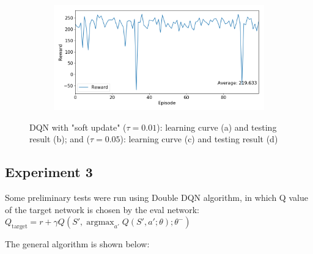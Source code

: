 \documentclass[10pt]{article}
\DeclareMathOperator*{\argmax}{argmax} %
\begin{document}
\begin{figure}[H]
\begin{subfigure}[b]{0.49\linewidth}
      \caption{}
  \label{fig:train_param_0060}
  \end{subfigure}
  \begin{subfigure}[b]{0.49\linewidth}
  \centering
  \includegraphics[width=\linewidth]{../logs/test_param_0060.png}
      \caption{}
  \label{fig:test_param_0060}
  \end{subfigure}
  \caption{DQN with "soft update" ($\tau=0.01$): learning curve (a) and testing result (b); and ($\tau=0.05$): learning curve (c) and testing result (d)}
  \label{fig:param_00590060}
\end{figure}


\subsection{Experiment 3} \label{experiment3}
Some preliminary tests were run using Double DQN algorithm, in which Q value of the target network is chosen by the eval network: $Q_{\text{target}}=r+\gamma Q(S',\argmax_{a'}Q(S',a';\theta);\theta^-)$

\noindent
The general algorithm is shown below:\par
\end{document}
